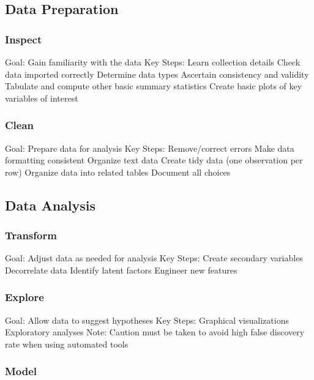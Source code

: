 \documentclass[
]{book}
\begin{document}
\hypertarget{data-preparation}{%
\subsection{Data Preparation}\label{data-preparation}}

\hypertarget{inspect}{%
\subsubsection{Inspect}\label{inspect}}

Goal:
Gain familiarity with the data
Key Steps:
Learn collection details
Check data imported correctly
Determine data types
Ascertain consistency and validity
Tabulate and compute other basic summary statistics
Create basic plots of key variables of interest

\hypertarget{clean}{%
\subsubsection{Clean}\label{clean}}

Goal:
Prepare data for analysis
Key Steps:
Remove/correct errors
Make data formatting consistent
Organize text data
Create tidy data (one observation per row)
Organize data into related tables
Document all choices

\hypertarget{data-analysis}{%
\subsection{Data Analysis}\label{data-analysis}}

\hypertarget{transform}{%
\subsubsection{Transform}\label{transform}}

Goal:
Adjust data as needed for analysis
Key Steps:
Create secondary variables
Decorrelate data
Identify latent factors
Engineer new features

\hypertarget{explore}{%
\subsubsection{Explore}\label{explore}}

Goal:
Allow data to suggest hypotheses
Key Steps:
Graphical visualizations
Exploratory analyses
Note:
Caution must be taken to avoid high false discovery rate when using automated tools

\hypertarget{model}{%
\subsubsection{Model}\label{model}}
\end{document}
